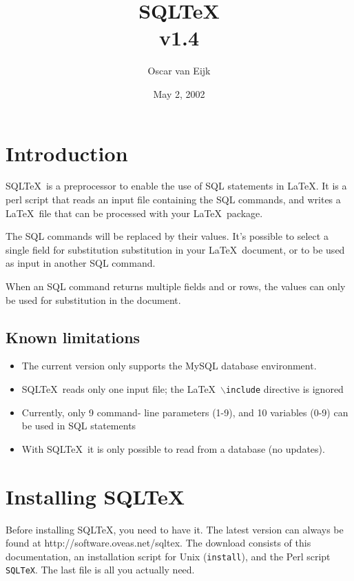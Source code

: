 \documentclass{article}
\newcommand{\bs}{\ensuremath{\backslash}}
\begin{document}
\title{SQL\TeX\\v1.4}
\date{May 2, 2002}
\author{Oscar van Eijk}

\maketitle

\hrulefill

\tableofcontents

\hrulefill

\section{Introduction}

SQL\TeX\ is a preprocessor to enable the use of SQL statements in \LaTeX. It is a perl script that reads
an input file containing the SQL commands, and writes a \LaTeX\ file that can be processed with your
\LaTeX\ package.

The SQL commands will be replaced by their values. It's possible to select a single field for substitution
substitution in your \LaTeX\ document, or to be used as input in another SQL command.

When an SQL command returns multiple fields and or rows, the values can only be used for substitution
in the document.

\subsection{Known limitations}

\begin{itemize}
\item The current version only supports the MySQL database environment.
\item SQL\TeX\ reads only one input file; the \LaTeX\ \texttt{\bs include} directive is ignored
\item Currently, only 9 command- line parameters (1-9), and 10 variables (0-9) can be used in SQL
statements
\item With SQL\TeX\, it is only possible to read from a database (no updates).
\end{itemize}

\section{Installing SQL\TeX}

Before installing SQL\TeX, you need to have it. The latest version can always be found at
\textsf{http://software.oveas.net/sqltex}.
The download consists of this do\-cumentation, an installation script for Unix
(\texttt{install}), and the Perl script \texttt{SQLTeX}. The last file is all
you actually need.
\end{document}
